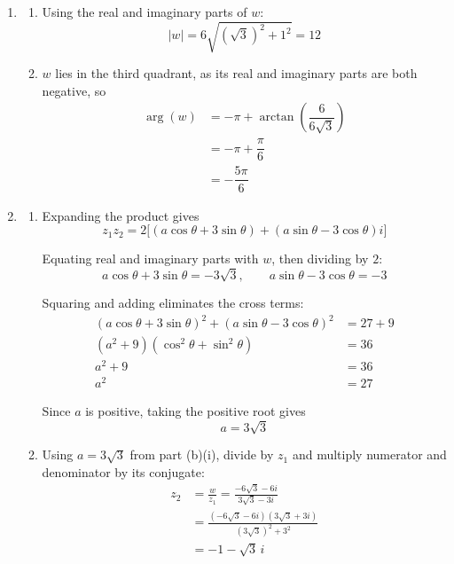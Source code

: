 \documentclass[leqno]{article}
\begin{document}
\begin{enumerate}[
  label=\textbf{\arabic*.},
  leftmargin=*,
  topsep=0pt,
  partopsep=0pt,
  parsep=0pt
]
\vspace*{10pt}

\begin{djsSolution}
\begin{enumerate}[label=\textbf{(\alph*)}, start=1]
\item
\begin{enumerate}[label=(\roman*), start=1]
\item Using the real and imaginary parts of \(w\):
\[
|w|=6\sqrt{(\sqrt{3})^2+1^2}=12
\]

\item \(w\) lies in the third quadrant, as its real and imaginary parts are both negative, so
\begin{align*}
\arg(w)&=-\pi+\arctan\left(\dfrac{6}{6\sqrt{3}}\right)\\
&=-\pi+\dfrac{\pi}{6}\\
&=-\dfrac{5\pi}{6}
\end{align*}

\end{enumerate}
\item
\begin{enumerate}[label=(\roman*), start=1]
\item Expanding the product gives
\[
z_1z_2=2\bigl[(a\cos\theta+3\sin\theta)+(a\sin\theta-3\cos\theta)i\bigr]
\]

Equating real and imaginary parts with \(w\), then dividing by \(2\):
\[
a\cos\theta+3\sin\theta=-3\sqrt{3},
\qquad
a\sin\theta-3\cos\theta=-3
\]

Squaring and adding eliminates the cross terms:
\begin{align*}
(a\cos\theta+3\sin\theta)^2+(a\sin\theta-3\cos\theta)^2&=27+9\\
(a^2+9)(\cos^2\theta+\sin^2\theta)&=36\\
a^2+9&=36\\
a^2&=27
\end{align*}

Since \(a\) is positive, taking the positive root gives
\[
a=3\sqrt{3}
\]

\item Using \(a=3\sqrt{3}\) from part (b)(i), divide by \(z_1\) and multiply numerator and denominator by its conjugate:
\begin{align*}
z_2&=\frac{w}{z_1}=\frac{-6\sqrt{3}-6i}{3\sqrt{3}-3i}\\
&=\frac{(-6\sqrt{3}-6i)(3\sqrt{3}+3i)}{(3\sqrt{3})^2+3^2}\\
&=-1-\sqrt{3}\,i
\end{align*}


\end{enumerate}
\end{enumerate}
\end{djsSolution}
\end{enumerate}
\end{document}
